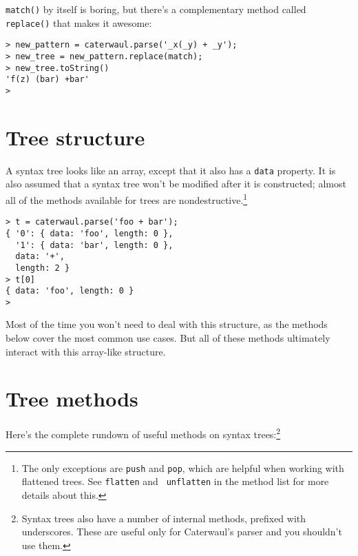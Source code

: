 \documentclass{report}
\begin{document}
  {\tt match()} by itself is boring, but there's a complementary method called {\tt replace()} that makes it awesome:

\begin{verbatim}
> new_pattern = caterwaul.parse('_x(_y) + _y');
> new_tree = new_pattern.replace(match);
> new_tree.toString()
'f(z) (bar) +bar'
>
\end{verbatim}

\section{Tree structure}
    A syntax tree looks like an array, except that it also has a {\tt data} property. It is also assumed that a syntax tree won't be modified after it is constructed; almost all of the methods
    available for trees are nondestructive.\footnote{The only exceptions are {\tt push} and {\tt pop}, which are helpful when working with flattened trees. See {\tt flatten} and {\tt
    unflatten} in the method list for more details about this.}

\begin{verbatim}
> t = caterwaul.parse('foo + bar');
{ '0': { data: 'foo', length: 0 },
  '1': { data: 'bar', length: 0 },
  data: '+',
  length: 2 }
> t[0]
{ data: 'foo', length: 0 }
>
\end{verbatim}

    Most of the time you won't need to deal with this structure, as the methods below cover the most common use cases. But all of these methods ultimately interact with this array-like
    structure.

\section{Tree methods}
    Here's the complete rundown of useful methods on syntax trees:\footnote{Syntax trees also have a number of internal methods, prefixed with underscores. These are useful only for
    Caterwaul's parser and you shouldn't use them.}
\end{document}
